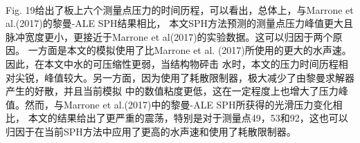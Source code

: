 \documentclass[UTF8]{ctexart}
\begin{document}
\paragraph{\quad}Fig. 19给出了板上六个测量点压力的时间历程，可以看出，总体上，与Marrone et al.(2017)的黎曼-ALE SPH结果相比，
                本文SPH方法预测的测量点压力峰值更大且脉冲宽度更小，更接近于Marrone et al(2017)的实验数据。这可以归因于两个原因。
                一方面是本文的模拟使用了比Marrone et al. (2017)所使用的更大的水声速。因此，在本文中水的可压缩性更弱，当结构物砰击
                水时，本文的压力时间历程相对尖锐，峰值较大。另一方面，因为使用了耗散限制器，极大减少了由黎曼求解器产生的好散，并且当前模拟
                中的数值粘度更低，这在一定程度上也增大了压力峰值。然而，与Marrone et al.(2017)中的黎曼-ALE SPH所获得的光滑压力变化相比，
                本文的结果给出了更严重的震荡，特别是对于测量点49，53和92，这也可以归因于在当前SPH方法中应用了更高的水声速和使用了耗散限制器。
\end{document}
